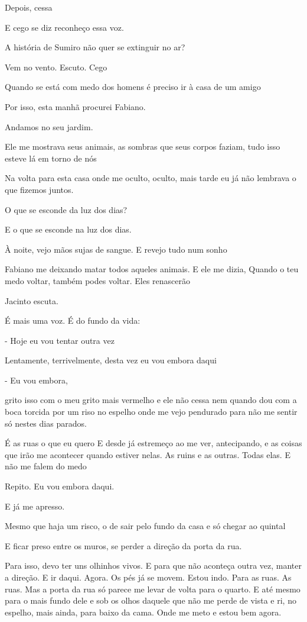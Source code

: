 Depois, cessa

E cego se diz reconheço essa voz.

A história de Sumiro não quer se extinguir no ar?

Vem no vento. Escuto. Cego

Quando se está com medo dos homens é preciso ir à casa de um amigo

Por isso, esta manhã procurei Fabiano.

Andamos no seu jardim.

Ele me mostrava seus animais, as sombras que seus corpos faziam, tudo
isso esteve lá em torno de nós

Na volta para esta casa onde me oculto, oculto, mais tarde eu já não
lembrava o que fizemos juntos.

O que se esconde da luz dos dias?

E o que se esconde na luz dos dias.

À noite, vejo mãos sujas de sangue. E revejo tudo num sonho

Fabiano me deixando matar todos aqueles animais. E ele me dizia, Quando
o teu medo voltar, também podes voltar. Eles renascerão

Jacinto escuta.

É mais uma voz. É do fundo da vida:

- Hoje eu vou tentar outra vez

Lentamente, terrivelmente, desta vez eu vou embora daqui

- Eu vou embora,

grito isso com o meu grito mais vermelho e ele não cessa nem quando dou
com a boca torcida por um riso no espelho onde me vejo pendurado para
não me sentir só nestes dias parados.

É as ruas o que eu quero E desde já estremeço ao me ver, antecipando, e
as coisas que irão me acontecer quando estiver nelas. As ruins e as
outras. Todas elas. E não me falem do medo

Repito. Eu vou embora daqui.

E já me apresso.

Mesmo que haja um risco, o de sair pelo fundo da casa e só chegar ao
quintal

E ficar preso entre os muros, se perder a direção da porta da rua.

Para isso, devo ter uns olhinhos vivos. E para que não aconteça outra
vez, manter a direção. E ir daqui. Agora. Os pés já se movem. Estou
indo. Para as ruas. As ruas. Mas a porta da rua só parece me levar de
volta para o quarto. E até mesmo para o mais fundo dele e sob os olhos
daquele que não me perde de vista e ri, no espelho, mais ainda, para
baixo da cama. Onde me meto e estou bem agora.

